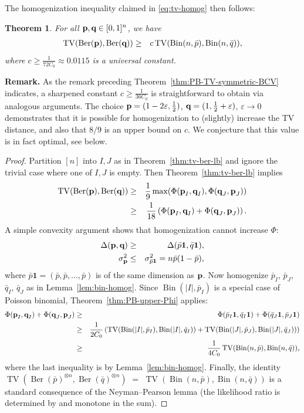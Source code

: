 \documentclass[11pt]{amsart}
\theoremstyle{plain}
\newtheorem{theorem}{Theorem}[section]
\theoremstyle{definition}
\DeclareMathOperator{\TV}{TV}
\DeclareMathOperator{\Bin}{Bin}
\DeclareMathOperator{\Ber}{Ber}
\newcommand{\beq}{\begin{eqnarray*}}
\newcommand{\eeq}{\end{eqnarray*}}
\newcommand{\paren}[1]{\left( #1 \right)}
\newcommand{\eps}{\varepsilon}
\newcommand{\mybin}[2]{\Bin(#1,#2)}
\newcommand{\CBCV}{C_0}
\renewcommand{\vec}[1]{\textup{{\bf #1}}}
\begin{document}
The homogenization inequality
claimed in \eqref{eq:tv-homog}
then follows:
\begin{theorem}
\label{thm:main-homog}
For all $\vec{p},\vec{q}\in[0,1]^n$, we have
\beq
\TV(\Ber(\vec{p}),\Ber(\vec{q}))
&\ge&
c\TV(\mybin{n}{\bar p},\mybin{n}{\bar q}),
\eeq
where $c\ge\frac{1}{72\CBCV}\approx
0.0115
$ is a universal constant.
\end{theorem}

\medskip\noindent\textbf{Remark.}
As the remark preceding Theorem~\ref{thm:PB-TV-symmetric-BCV} indicates, a sharpened constant $c\ge\frac{1}{36\CBCV}$
is straightforward to obtain via analogous arguments.
The choice
$\vec p = (1-2\varepsilon, \tfrac12)$,
$\vec q = (1, \tfrac12+\varepsilon)$,
$\eps\to0$ demonstrates that
it is possible for homogenization to (slightly) increase the TV distance,
and also that
$8/9$ is an upper bound on $c$.
We conjecture that this value is in fact optimal, see below.
\begin{proof}
Partition $[n]$ into $I,J$ as in
Theorem~\ref{thm:tv-ber-lb} and ignore the trivial case where one of $I,J$ is empty. Then
Theorem~\ref{thm:tv-ber-lb}
implies
\beq
\TV(\Ber(\vec{p}),\Ber(\vec{q}))
&\ge&
\frac{1}{9}
\max(
\Phi(\vec{p}_I,\vec{q}_I)
,
\Phi(\vec{q}_J,\vec{p}_J)
)
\\
&\ge&
\frac{1}{18}\paren{
\Phi(\vec{p}_I,\vec{q}_I)
+
\Phi(\vec{q}_J,\vec{p}_J)
}
.
\eeq
A simple convexity argument shows that
homogenization cannot increase $\Phi$:
\beq
\Delta(\vec{p},\vec{q}) &\ge& \Delta(\bar p\boldsymbol{1},\bar q\boldsymbol{1}),\\
\sigma_{\vec{p}}^2 &\le& \sigma_{\bar p\boldsymbol{1}}^2=n\bar p(1-\bar p),
\eeq
where $\bar p\boldsymbol{1}=(\bar p,\bar p,\ldots, \bar p)
$
is of the same dimension as $\vec{p}$.
Now homogenize
$\bar p_I$,
$\bar p_J$,
$\bar q_I$,
$\bar q_J$
as in Lemma~\ref{lem:bin-homog}.
Since $
\mybin{|I|}{\bar p_I}
$ is a special case of Poisson binomial,
Theorem~\ref{thm:PB-upper-Phi} applies:
\beq
\Phi(\vec{p}_I,\vec{q}_I)
+
\Phi(\vec{q}_J,\vec{p}_J)
&\ge&
\Phi(\bar p_I\boldsymbol{1},\bar q_I\boldsymbol{1})
+
\Phi(
\bar q_J\boldsymbol{1}
,
\bar p_J\boldsymbol{1}
)
\\
&\ge&
\frac{1}{2\CBCV}
\paren{
\TV(
\mybin{|I|}{\bar p_I}
,
\mybin{|I|}{\bar q_I}
)
+
\TV(
\mybin{|J|}{\bar p_J}
,
\mybin{|J|}{\bar q_J}
)
}\\
&\ge&
\frac{1}{
4
\CBCV}
\TV(
\mybin{n}{\bar p}
,
\mybin{n}{\bar q}
),
\eeq
where the
last
inequality is by
Lemma~\ref{lem:bin-homog}.
Finally, the identity
$
\TV(
\Ber(\bar p)^{\otimes n}
,
\Ber(\bar q)^{\otimes n}
)$
$=$
$\TV(\mybin{n}{\bar p},\mybin{n}{\bar q})
$
is a standard consequence of the
Neyman–Pearson lemma
(the likelihood ratio is determined by
and monotone in
the sum).
\end{proof}
\end{document}
